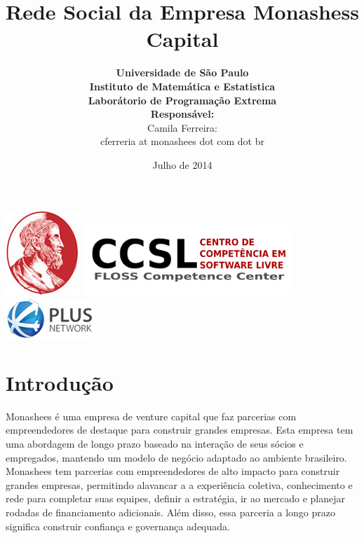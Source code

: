 \documentclass[12pt, letterpaper, onecolumn]{article}
\title{\bf \huge Rede Social da Empresa Monashess Capital}
\author{{\bf Universidade de São Paulo} \\ {\bf Instituto de Matemática e Estatistica} \\ {\bf  \large Laborátorio de Programação Extrema} \vspace{1cm}\\{
\bf  \large Responsável: }\\ Camila Ferreira: \\cferreria at monashees dot com dot br}
\date{Julho de 2014}
\begin{document}
\maketitle
\begin{center}
\includegraphics[scale=.475]{images/ime.jpg}\hfil
\includegraphics[scale=2.25]{images/ccsl.png}\hfil
\includegraphics[scale=1]{images/logo.png}

\end{center}

\newpage
\tableofcontents
\newpage



\section{Introdução} 
Monashees é uma empresa de venture capital que faz parcerias com empreendedores de destaque para construir grandes empresas. Esta empresa tem uma abordagem de longo prazo baseado na interação de seus sócios e empregados, mantendo um modelo de negócio adaptado ao ambiente brasileiro. \\

Monashees tem parcerias com empreendedores de alto impacto para construir grandes empresas, permitindo alavancar a a experiência coletiva, conhecimento e rede para completar suas equipes, definir a estratégia, ir ao mercado e planejar rodadas de financiamento adicionais. Além disso, essa parceria a longo prazo significa construir confiança e governança adequada.\\
\end{document}
